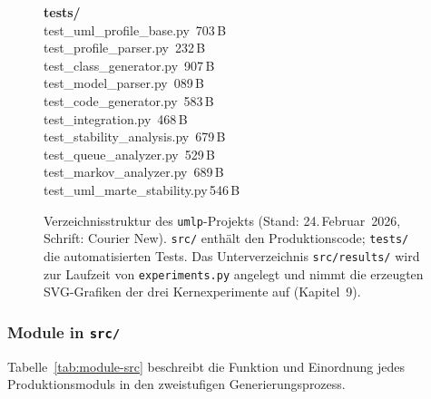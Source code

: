 ﻿\documentclass[a4paper,12pt]{scrreprt}
\theoremstyle{definition}
\begin{document}
\begin{figure}[H]
{\begin{minipage}{0.86\textwidth}
			{\bfseries tests/}\\
			\treemid test\_uml\_profile\_base.py   \,703\,B\\
			\treemid test\_profile\_parser.py      \,232\,B\\
			\treemid test\_class\_generator.py     \,907\,B\\
			\treemid test\_model\_parser.py        \,089\,B\\
			\treemid test\_code\_generator.py      \,583\,B\\
			\treemid test\_integration.py          \,468\,B\\
			\treemid test\_stability\_analysis.py  \,679\,B\\
			\treemid test\_queue\_analyzer.py      \,529\,B\\
			\treemid test\_markov\_analyzer.py     \,689\,B\\
			\treeend test\_uml\_marte\_stability.py\,546\,B\\
			
		\end{minipage}%
	}
	\caption{Verzeichnisstruktur des \texttt{umlp}-Projekts
		(Stand: 24.\,Februar~2026, Schrift: Courier New).
		\texttt{src/} enthält den Produktionscode;
		\texttt{tests/} die automatisierten Tests.
		Das Unterverzeichnis \texttt{src/results/} wird
		zur Laufzeit von \texttt{experiments.py} angelegt
		und nimmt die erzeugten SVG-Grafiken der drei
		Kernexperimente auf (Kapitel~9).}
	\label{fig:projektstruktur}
\end{figure}


\subsubsection{Module in \texttt{src/}}
\label{subsubsec:module-src}

Tabelle~\ref{tab:module-src} beschreibt die Funktion und
Einordnung jedes Produktionsmoduls in den zweistufigen
Generierungsprozess.
\end{document}

